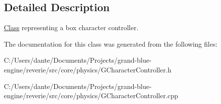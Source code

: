 \subsection{Detailed Description}
\mbox{\hyperlink{struct_class}{Class}} representing a box character controller. 

The documentation for this class was generated from the following files\+:\begin{DoxyCompactItemize}
\item 
C\+:/\+Users/dante/\+Documents/\+Projects/grand-\/blue-\/engine/reverie/src/core/physics/G\+Character\+Controller.\+h\item 
C\+:/\+Users/dante/\+Documents/\+Projects/grand-\/blue-\/engine/reverie/src/core/physics/G\+Character\+Controller.\+cpp\end{DoxyCompactItemize}
